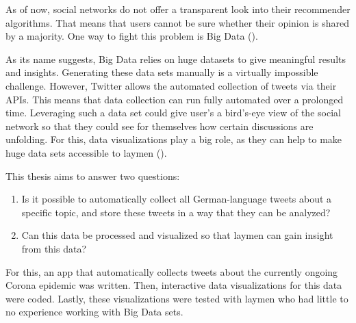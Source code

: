 As of now, social networks do not offer a transparent look into their recommender algorithms. That means that users cannot be sure whether their opinion is shared by a majority. One way to fight this problem is Big Data (\cite{crawfordCriticalQuestionsBig2012}).

As its name suggests, Big Data relies on huge datasets to give meaningful results and insights. Generating these data sets manually is a virtually impossible challenge. However, Twitter allows the automated collection of tweets via their APIs. This means that data collection can run fully automated over a prolonged time. Leveraging such a data set could give user's a bird's-eye view of the social network so that they could see for themselves how certain discussions are unfolding. For this, data visualizations play a big role, as they can help to make huge data sets accessible to laymen (\cite{donalekImmersiveCollaborativeData2014}).

This thesis aims to answer two questions:

\begin{enumerate}
    \item Is it possible to automatically collect all German-language tweets about a specific topic, and store these tweets in a way that they can be analyzed?
    \item Can this data be processed and visualized so that laymen can gain insight from this data?
\end{enumerate}

For this, an app that automatically collects tweets about the currently ongoing Corona epidemic was written. Then, interactive data visualizations for this data were coded. Lastly, these visualizations were tested with laymen who had little to no experience working with Big Data sets.
